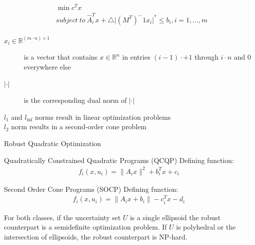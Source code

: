 \documentclass{beamer}
\begin{document}
\begin{frame}{}
\begin{align*}
\begin{split}
& \min c^Tx \\
& subject~to~\hat{A}_{i}^{T}x + \triangle \lvert (M^T)^-1x_i \rvert ^{*} \leq b_i, i=1,\dots,m
\end{split}
\end{align*}
\begin{description}
\item [$x_i \in \mathbb{R}^{(m \cdot n)\times1}$] is a vector that contains $x \in \mathbb{R}^{n}$ in entries $(i-1)\cdot + 1$ through $i \cdot n$ and 0 everywhere else
\item [$\lvert \cdot \rvert$] is the corresponding dual norm of $\lvert \cdot \rvert$
\end{description}
$l_1$ and $l_{\inf}$ norms result in linear optimization problems \\
$l_2$ norm results in a second-order cone problem
\end{frame}

\begin{frame}{Robust Quadratic Optimization}
\begin{block}{Quadratically Constrained Quadratic Programs (QCQP)}
Defining function:
\begin{align*}
f_{i}(x,u_i) = \lVert A_ix \rVert ^{2} + b_i^Tx + c_i
\end{align*}
\end{block}
\begin{block}{Second Order Cone Programs (SOCP)}
Defining function:
\begin{align*}
f_{i}(x, u_i) = \lVert A_ix + b_i \rVert - c_i^Tx - d_i
\end{align*}
\end{block}
For both classes, if the uncertainty set $U$ is a single ellipsoid the robust counterpart is a semidefinite optimization problem.
If $U$ is polyhedral or the intersection of ellipsoids, the robust counterpart is NP-hard.
\end{frame}
\end{document}
